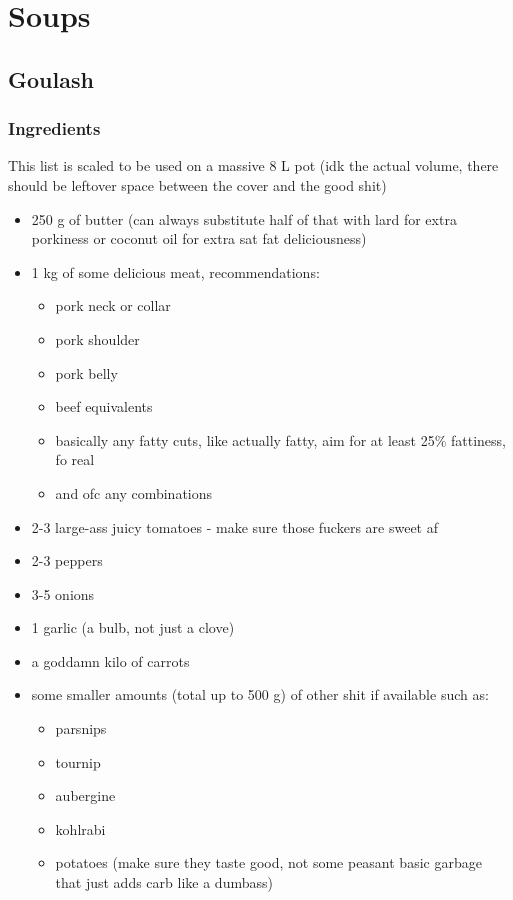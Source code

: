 \documentclass[10pt]{article}
\begin{document}
\section{Soups}%
\label{sec:soups}

\subsection{Goulash}%
\label{sub:goulash}
\subsubsection{Ingredients}%
\label{ssub:goulash_ingredients}
This list is scaled to be used on a massive 8 L pot (idk the actual volume, there should be leftover space between the cover and the good shit)
\begin{itemize}
	\item 250 g of butter (can always substitute half of that with lard for extra porkiness or coconut oil for extra sat fat deliciousness)	
	\item 1 kg of some delicious meat, recommendations:
		\begin{itemize}
			\item pork neck or collar
			\item pork shoulder
			\item pork belly
			\item beef equivalents
			\item basically any fatty cuts, like actually fatty, aim for at least 25\% fattiness, fo real
			\item and ofc any combinations
		\end{itemize}
	\item 2-3 large-ass juicy tomatoes - make sure those fuckers are sweet af
	\item 2-3 peppers
	\item 3-5 onions
	\item 1 garlic (a bulb, not just a clove)
	\item a goddamn kilo of carrots
	\item some smaller amounts (total up to 500 g) of other shit if available such as:
		\begin{itemize}
			\item parsnips
			\item tournip
			\item aubergine
			\item kohlrabi
			\item potatoes (make sure they taste good, not some peasant basic garbage that just adds carb like a dumbass)

\end{itemize}
\end{itemize}
\end{document}
